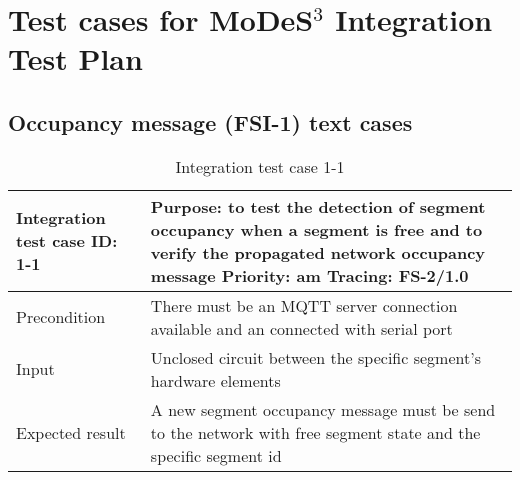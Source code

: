 \section{Test cases for MoDeS$^3$ Integration Test Plan} \label{appendix:IntTC}

\subsection{Occupancy message (FSI-1) text cases} 
\begin{table}[H]
	\caption{Integration test case 1-1}
	\label{table:TCase-FSI1-1}
	\begin{center}
		\renewcommand{\arraystretch}{1.8}
		\begin{tabu} 
			to 0.9 \textwidth
			{  X[0.3, l] X[l] }
			\toprule
			Integration test case ID: 1-1 & Purpose: to test the detection of segment occupancy when a segment is free and to verify the propagated network occupancy message \newline Priority: am \newline Tracing: FS-2/1.0 \\ \midrule
			Precondition                  & There must be an MQTT server connection available and an connected with serial port                                                                                                \\
			Input                         & Unclosed circuit between the specific segment's hardware elements                                                                                                                  \\
			Expected result               & A new segment occupancy message must be send to the network with free segment state  and the specific segment id                                                                   \\ \bottomrule
		\end{tabu}
	\end{center}
\end{table} 

